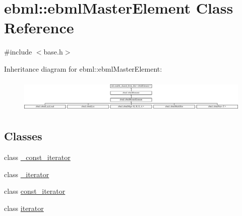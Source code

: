 \hypertarget{classebml_1_1ebmlMasterElement}{}\section{ebml\+:\+:ebml\+Master\+Element Class Reference}
\label{classebml_1_1ebmlMasterElement}


{\ttfamily \#include $<$base.\+h$>$}

Inheritance diagram for ebml\+:\+:ebml\+Master\+Element\+:\begin{figure}[H]
\begin{center}
\leavevmode
\includegraphics[height=1.611511cm]{classebml_1_1ebmlMasterElement}
\end{center}
\end{figure}
\subsection*{Classes}
\begin{DoxyCompactItemize}
\item 
class \mbox{\hyperlink{classebml_1_1ebmlMasterElement_1_1__const__iterator}{\+\_\+const\+\_\+iterator}}
\item 
class \mbox{\hyperlink{classebml_1_1ebmlMasterElement_1_1__iterator}{\+\_\+iterator}}
\item 
class \mbox{\hyperlink{classebml_1_1ebmlMasterElement_1_1const__iterator}{const\+\_\+iterator}}
\item 
class \mbox{\hyperlink{classebml_1_1ebmlMasterElement_1_1iterator}{iterator}}
\end{DoxyCompactItemize}
